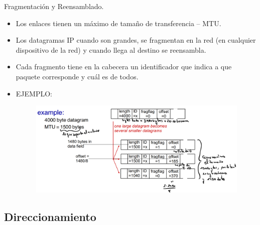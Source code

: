 \documentclass[12pt, twoside, openright]{report} %
\begin{document}
	Fragmentación y Reensamblado.

    \begin{itemize}
    \item
      Los enlaces tienen un máximo de tamaño de transferencia -- MTU.
    \item
      Los datagramas IP cuando son grandes, se fragmentan en la red (en
      cualquier dispositivo de la red) y cuando llega al destino se
      reensambla.
    \item
      Cada fragmento tiene en la cabecera un identificador que indica a
      que paquete corresponde y cuál es de todos.
    \item
      EJEMPLO:
	  \begin{figure}[H]
		{\includegraphics[scale=.21]{Untitled 29.png}}
	\end{figure}
    \end{itemize}

	\pagebreak
\subsection{Direccionamiento}
\end{document}
